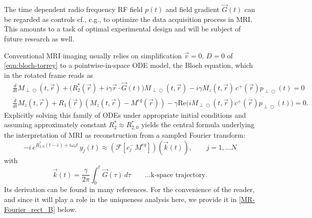 \documentclass{ws-m3as}
\renewcommand\Re{\mathrm{Re}}
\def\Mpp{M_{\perp\!\!\!\!\!\bigcirc}}
\def\pp{p_{\perp\!\!\!\!\!\bigcirc}}
\newcommand\taup{\varepsilon}
\newcommand{\revision}[1]{{ #1}}
\newcommand{\Margin}[1]{}
\begin{document}
The time dependent 
radio frequency RF field $p(t)$ and 
field gradient $\vec G(t)$
can be regarded as controls
cf., e.g., \cite{AignerClasonRundStollberger2016}
to optimize the data acquisition process in MRI.
\revision{This amounts to a task of optimal experimental design and will be subject of future research as well.}
\Margin{R2 (2)}


Conventional MRI imaging usually relies on simplification $\vec v=0$, $D=0$ of \eqref{eqn:bloch-torrey} to a pointwise-in-space ODE model, the Bloch equation, which in the rotated frame reads as
\begin{equation}\label{bloch-rotated}
\begin{aligned}
&\frac{d}{dt}\Mpp(t, \vec r) +\bigl(R_2^*(\vec r) + i\gamma\vec r \cdot \vec G(t)\bigr)\Mpp(t, \vec r)
-i\gamma  M_z(t, \vec r) \, c^+(\vec r)\pp(t)
=0
\\    
&\frac{d}{dt}M_z(t, \vec r) +R_1(\vec r) (M_z(t, \vec r)-M^{eq}(\vec r))
-\gamma\Re\bigl(i \Mpp(t, \vec r)\overline{c^+(\vec r)\pp(t)}\bigr)
=0.
\end{aligned}
\end{equation}
Explicitly solving this family of ODEs under appropriate initial conditions and assuming approximately constant $R_2^*\approx R_{2,0}^*$ yields the central formula underlying the interpretation of MRI as reconstruction from a sampled Fourier transform: 
\begin{equation}\label{MR-Fourier_rect_B_intro} 
-i\,e^{R_{2,0}^*(t-\taup)+ i\omega_0t} \, y_j(t) 
\approx (\mathcal{F}[c^-_j\,M^{eq}])({\vec k}(t))
,\qquad j=1,\ldots N
\end{equation}
with 
\begin{equation}\label{kt_intro}
{\vec k}(t)=\frac{\gamma}{2\pi}\int_0^t \vec G(\tau)\, d\tau 
\qquad\text{\ldots k-space trajectory}.
\end{equation}
Its derivation can be found in many references. For the convenience of the reader, and since it will play a role in the uniqueness analysis here, we provide it in \eqref{MR-Fourier_rect_B} below.

\medskip
\end{document}
